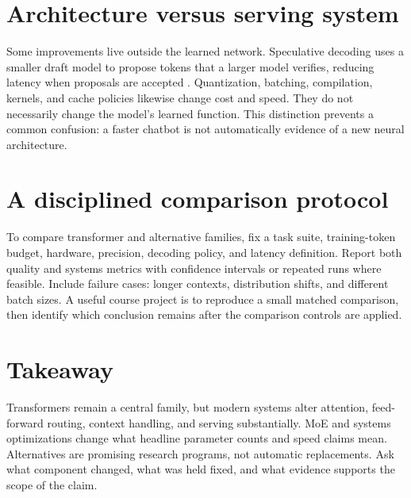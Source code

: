 \documentclass[11pt]{article}
\begin{document}
\section{Architecture versus serving system}
Some improvements live outside the learned network. Speculative decoding uses a smaller draft model to propose tokens that a larger model verifies, reducing latency when proposals are accepted \cite{leviathan2023fast}. Quantization, batching, compilation, kernels, and cache policies likewise change cost and speed. They do not necessarily change the model's learned function. This distinction prevents a common confusion: a faster chatbot is not automatically evidence of a new neural architecture.

\section{A disciplined comparison protocol}
To compare transformer and alternative families, fix a task suite, training-token budget, hardware, precision, decoding policy, and latency definition. Report both quality and systems metrics with confidence intervals or repeated runs where feasible. Include failure cases: longer contexts, distribution shifts, and different batch sizes. A useful course project is to reproduce a small matched comparison, then identify which conclusion remains after the comparison controls are applied.

\section{Takeaway}
Transformers remain a central family, but modern systems alter attention, feed-forward routing, context handling, and serving substantially. MoE and systems optimizations change what headline parameter counts and speed claims mean. Alternatives are promising research programs, not automatic replacements. Ask what component changed, what was held fixed, and what evidence supports the scope of the claim.

\end{document}
